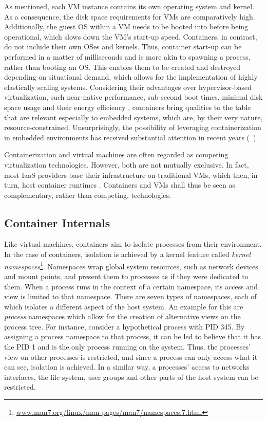 As mentioned, each VM instance contains its own operating system and kernel. As a consequence, the disk space requirements for VMs are comparatively high. Additionally, the guest OS within a VM needs to be booted into before being operational, which slows down the VM's start-up speed. Containers, in contrast, do not include their own OSes and kernels. Thus, container start-up can be performed in a matter of milliseconds and is more akin to spawning a process, rather than booting an OS. This enables them to be created and destroyed depending on situational demand, which allows for the implementation of highly elastically scaling systems. 
Considering their advantages over hypervisor-based virtualization, such near-native performance, sub-second boot times, minimal disk space usage and their energy efficiency \cite{morabito2015power}, containers bring qualities to the table that are relevant especially to embedded systems, which are, by their very nature, resource-constrained. Unsurprisingly, the possibility of leveraging containerization in embedded environments has received substantial attention in recent years (\eg\  \cite{bellavista2017feasibility, javed2016container, morabito2017virtualization}).

Containerization and virtual machines are often regarded as competing virtualization technologies. However, both are not mutually exclusive. In fact, most IaaS providers base their infrastructure on traditional VMs, which then, in turn, host container runtimes \cite{dua2014virtualization}. Containers and VMs shall thus be seen as complementary, rather than competing, technologies.

\subsection{Container Internals}
Like virtual machines, containers aim to isolate processes from their environment. In the case of containers, isolation is achieved by a kernel feature called \emph{kernel namespaces}\footnote{\url{www.man7.org/linux/man-pages/man7/namespaces.7.html}}. Namespaces wrap global system resources, such as network devices and mount points, and present them to processes as if they were dedicated to them. 
When a process runs in the context of a certain namespace, its access and view is limited to that namespace. 
There are seven types of namespaces, each of which isolates a different aspect of the host system. 
An example for this are \emph{process} namespaces which allow for the creation of alternative views on the process tree. For instance, consider a hypothetical process with PID 345. By assigning a process namespace to that process, it can be led to believe that it has the PID 1 and is the only process running on the system. Thus, the processes' view on other processes is restricted, and since a process can only access what it can see, isolation is achieved.
In a similar way, a processes' access to networks interfaces, the file system, user groups and other parts of the host system can be restricted.

